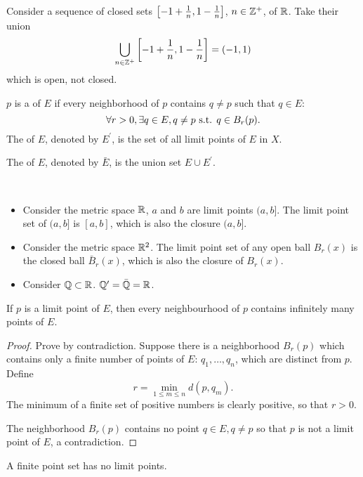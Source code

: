 \begin{example}
Consider a sequence of closed sets $\left[-1+\frac{1}{n},1-\frac{1}{n}\right]$, $n\in\mathbb Z^+$, of $\mathbb R$. Take their union
\[\bigcup_{n\in\mathbb Z^+}\left[-1+\frac{1}{n},1-\frac{1}{n}\right]=(-1,1)\]
which is open, not closed.
\end{example}

\begin{definition}
$p$ is a  of $E$ if every neighborhood of $p$ contains $q\neq p$ such that $q\in E$:
\[ \forall r>0,\exists q\in E, q\neq p\text{ s.t. } q\in B_r(p). \]
The  of $E$, denoted by $E^\prime$, is the set of all limit points of $E$ in $X$.

The  of $E$, denoted by $\bar{E}$, is the union set $E\cup E^\prime$.
\end{definition}

\begin{example} \
\begin{itemize}
\item Consider the metric space $\mathbb R$, $a$ and $b$ are limit points $(a,b]$. The limit point set of $(a,b]$ is $[a,b]$, which is also the closure $(a,b]$.
\item Consider the metric space $\mathbb R^2$. The limit point set of any open ball $B_r(x)$ is the closed ball $\bar{B}_r(x)$, which is also the closure of $B_r(x)$.
\item Consider $\mathbb Q\subset\mathbb R$. $\mathbb Q^\prime=\bar{\mathbb Q}=\mathbb R$.
\end{itemize}
\end{example}

\begin{proposition}
If $p$ is a limit point of $E$, then every neighbourhood of $p$ contains infinitely many points of $E$.
\end{proposition}

\begin{proof}
Prove by contradiction. Suppose there is a neighborhood $B_r(p)$ which contains only a finite number of points of $E$: $q_1,\dots,q_n$, which are distinct from $p$. Define
\[ r=\min_{1\le m\le n} d(p,q_m). \]
The minimum of a finite set of positive numbers is clearly positive, so that $r>0$.

The neighborhood $B_r(p)$ contains no point $q\in E,q\neq p$ so that $p$ is not a limit point of $E$, a contradiction.
\end{proof}

\begin{corollary}
A finite point set has no limit points.
\end{corollary}

